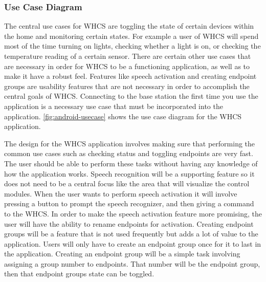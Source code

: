 \subsubsection{Use Case Diagram} The central use cases for WHCS are toggling
the state of certain devices within the home and monitoring certain states.
For example a user of WHCS will spend most of the time turning on lights,
checking whether a light is on, or checking the temperature reading of a
certain sensor. There are certain other use cases that are necessary in order
for WHCS to be a functioning application, as well as to make it have a robust
feel. Features like speech activation and creating endpoint groups are
usability features that are not necessary in order to accomplish the central
goals of WHCS.  Connecting to the base station the first time you use the
application is a necessary use case that must be incorporated into the
application. \autoref{fig:android-usecase} shows the use case diagram for the
WHCS application.

The design for the WHCS application involves making sure that performing the
common use cases such as checking status and toggling endpoints are very fast.
The user should be able to perform these tasks without having any knowledge of
how the application works. Speech recognition will be a supporting feature so
it does not need to be a central focus like the area that will visualize the
control modules. When the user wants to perform speech activation it will
involve pressing a button to prompt the speech recognizer, and then giving a
command to the WHCS. In order to make the speech activation feature more
promising, the user will have the ability to rename endpoints for activation.
Creating endpoint groups will be a feature that is not used frequently but adds
a lot of value to the application. Users will only have to create an endpoint
group once for it to last in the application. Creating an endpoint group will
be a simple task involving assigning a group number to endpoints. That number
will be the endpoint group, then that endpoint groups state can be toggled.


